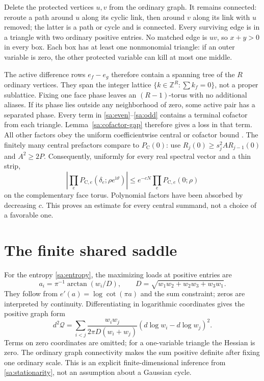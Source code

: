 \documentclass[11pt]{article}
\numberwithin{equation}{section}
\theoremstyle{definition}\newtheorem{definition}[theorem]{Definition}
\theoremstyle{remark}\newtheorem{remark}[theorem]{Remark}
\newcommand{\ii}{\mathrm i}
\newcommand{\calQ}{\mathcal Q}
\begin{document}
Delete the protected vertices $u,v$ from the ordinary graph. It remains
connected: reroute a path around $u$ along its cyclic link, then around
$v$ along its link with $u$ removed; the latter is a path or cycle and
is connected. Every surviving edge is in a triangle with two ordinary
positive entries. No matched edge is $uv$, so $x+y>0$ in every box.
Each box has at least one nonmonomial triangle: if an outer variable
is zero, the other protected variable can kill at most one middle.

The active difference rows $e_f-e_g$ therefore contain a spanning tree
of the $R$ ordinary vertices. They span the integer lattice
$\{k\in\mathbb Z^R:\sum k_f=0\}$, not a proper sublattice. Fixing one
face phase leaves an $(R-1)$-torus with no additional aliases.
If its phase lies outside any neighborhood of zero, some active pair
has a separated phase. Every term in \eqref{sa:even}--\eqref{sa:odd}
contains a terminal cofactor from each triangle. Lemma~\ref{sa:cofactor-gap}
therefore gives a loss in that term. All other factors obey the
uniform coefficientwise central or cofactor bound
\cite[Proposition 3.3 and Lemma 3.2]{Local}. The finitely many central
prefactors compare to $P_{\mathrm C}(0)$: use
$R_j(0)\ge s_j^2A R_{j-1}(0)$ and $A^2\ge2P$.
Consequently, uniformly for every real spectral vector and a thin strip,
\begin{equation}\label{sa:global-angular}
 \left|\prod_eP_{\mathrm C,e}(\delta_e;\rho e^{\ii\vartheta})\right|
 \le e^{-cN}\prod_eP_{\mathrm C,e}(0;\rho)
\end{equation}
on the complementary face torus. Polynomial factors have been
absorbed by decreasing $c$. This proves an estimate for every central
summand, not a choice of a favorable one.

\section{The finite shared saddle}\label{sa:saddle}
For the entropy \eqref{sa:entropy}, the maximizing loads at positive
entries are
\[
 a_i=\pi^{-1}\arctan(w_i/D),\qquad
                      D=\sqrt{w_1w_2+w_2w_3+w_3w_1}.
\]
They follow from $e'(a)=\log\cot(\pi a)$ and the sum constraint;
zeros are interpreted by continuity. Differentiating in logarithmic
coordinates gives the positive graph form
\begin{equation}\label{sa:laplacian}
 d^2\calQ=\sum_{i<j}\frac{w_iw_j}{2\pi D(w_i+w_j)}
                          (d\log w_i-d\log w_j)^2.
\end{equation}
Terms on zero coordinates are omitted; for a one-variable triangle
the Hessian is zero. The ordinary graph connectivity makes the sum
positive definite after fixing one ordinary scale. This is an explicit
finite-dimensional inference from \eqref{sa:stationarity}, not an
assumption about a Gaussian cycle.
\end{document}
